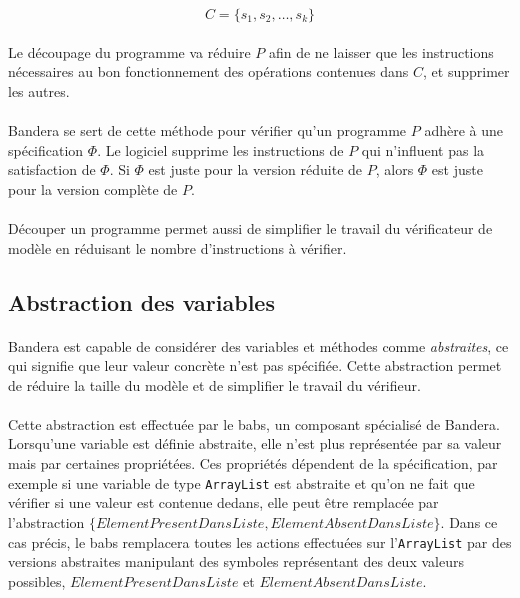 $$C = \{s_1, s_2, \ldots, s_k\}$$

\paragraph{}
Le découpage du programme va réduire $P$ afin de ne laisser que les
instructions nécessaires au bon fonctionnement des opérations
contenues dans $C$, et supprimer les autres.

\paragraph{}
Bandera se sert de cette méthode pour vérifier qu'un programme $P$
adhère à une spécification $\Phi$. Le logiciel supprime les
instructions de $P$ qui n'influent pas la satisfaction de $\Phi$. Si
$\Phi$ est juste pour la version réduite de $P$, alors $\Phi$ est
juste pour la version complète de $P$.

\paragraph{}
Découper un programme permet aussi de simplifier le travail du
vérificateur de modèle en réduisant le nombre d'instructions à
vérifier.

\subsection{Abstraction des variables}
\label{sec:bandera_abstraction}

\paragraph{}
Bandera est capable de considérer des variables et méthodes comme
\textit{abstraites}, ce qui signifie que leur valeur concrète n'est
pas spécifiée. Cette abstraction permet de réduire la taille du modèle
et de simplifier le travail du vérifieur.

\paragraph{}
Cette abstraction est effectuée par le \gls{babs}, un composant
spécialisé de Bandera. Lorsqu'une variable est définie abstraite, elle
n'est plus représentée par sa valeur mais par certaines
propriétées. Ces propriétés dépendent de la spécification, par exemple
si une variable de type \verb|ArrayList| est abstraite et qu'on ne
fait que vérifier si une valeur est contenue dedans, elle peut être
remplacée par l'abstraction
$\{ ElementPresentDansListe, ElementAbsentDansListe \}$. Dans ce cas
précis, le \gls{babs} remplacera toutes les actions effectuées sur
l'\verb|ArrayList| par des versions abstraites manipulant des symboles
représentant des deux valeurs possibles, $ElementPresentDansListe$ et
$ElementAbsentDansListe$.

